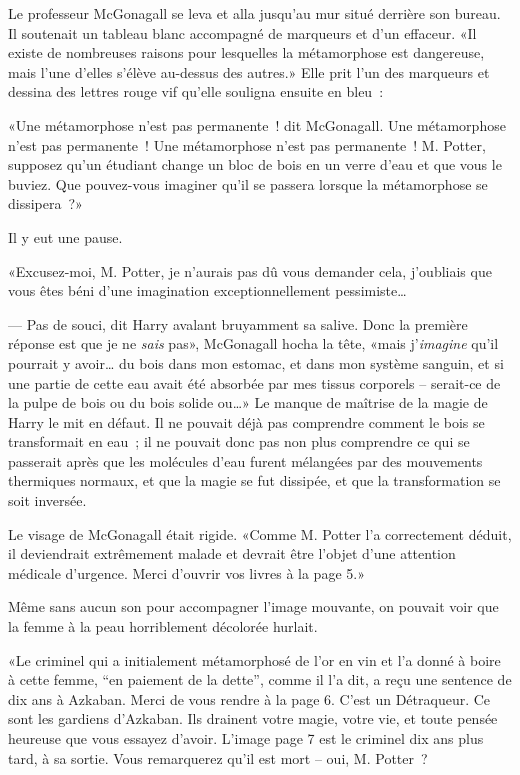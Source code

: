 Le professeur McGonagall se leva et alla jusqu'au mur situé derrière son bureau. Il soutenait un tableau blanc accompagné de marqueurs et d'un effaceur. «Il existe de nombreuses raisons pour lesquelles la métamorphose est dangereuse, mais l'une d'elles s'élève au-dessus des autres.» Elle prit l'un des marqueurs et dessina des lettres rouge vif qu'elle souligna ensuite en bleu~:


«Une métamorphose n'est pas permanente~! dit McGonagall. Une métamorphose n'est pas permanente~! Une métamorphose n'est pas permanente~! M. Potter, supposez qu'un étudiant change un bloc de bois en un verre d'eau et que vous le buviez. Que pouvez-vous imaginer qu'il se passera lorsque la métamorphose se dissipera~?»

Il y eut une pause.

«Excusez-moi, M. Potter, je n'aurais pas dû vous demander cela, j'oubliais que vous êtes béni d'une imagination exceptionnellement pessimiste…

--- Pas de souci, dit Harry avalant bruyamment sa salive. Donc la première réponse est que je ne \emph{sais} pas», McGonagall hocha la tête, «mais j'\emph{imagine} qu'il pourrait y avoir… du bois dans mon estomac, et dans mon système sanguin, et si une partie de cette eau avait été absorbée par mes tissus corporels -- serait-ce de la pulpe de bois ou du bois solide ou…» Le manque de maîtrise de la magie de Harry le mit en défaut. Il ne pouvait déjà pas comprendre comment le bois se transformait en eau~; il ne pouvait donc pas non plus comprendre ce qui se passerait après que les molécules d'eau furent mélangées par des mouvements thermiques normaux, et que la magie se fut dissipée, et que la transformation se soit inversée.

Le visage de McGonagall était rigide. «Comme M. Potter l'a correctement déduit, il deviendrait extrêmement malade et devrait être l'objet d'une attention médicale d'urgence. Merci d'ouvrir vos livres à la page 5.»

Même sans aucun son pour accompagner l'image mouvante, on pouvait voir que la femme à la peau horriblement décolorée hurlait.

«Le criminel qui a initialement métamorphosé de l'or en vin et l'a donné à boire à cette femme, “en paiement de la dette”, comme il l'a dit, a reçu une sentence de dix ans à Azkaban. Merci de vous rendre à la page 6. C'est un Détraqueur. Ce sont les gardiens d'Azkaban. Ils drainent votre magie, votre vie, et toute pensée heureuse que vous essayez d'avoir. L'image page 7 est le criminel dix ans plus tard, à sa sortie. Vous remarquerez qu'il est mort -- oui, M. Potter~?

